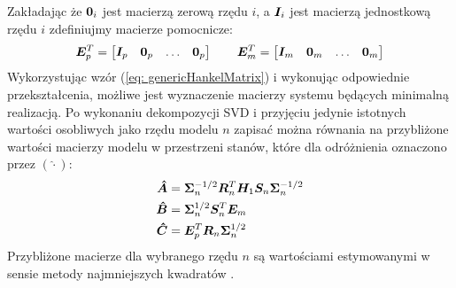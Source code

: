 Zakładając że $\bm{0}_i$ jest macierzą zerową rzędu $i$, a $\bm{I}_i$ jest macierzą jednostkową rzędu $i$ zdefiniujmy macierze pomocnicze:
\begin{equation} 
	\bm{E}^T_p =\begin{bmatrix}
		\bm{I}_p & \bm{0}_p & \dots & \bm{0}_p	
	\end{bmatrix} \qquad
	\bm{E}^T_m = \begin{bmatrix}
		\bm{I}_m & \bm{0}_m & \dots & \bm{0}_m	
	\end{bmatrix} 
\end{equation}
Wykorzystując wzór (\ref{eq: genericHankelMatrix}) i wykonując odpowiednie przekształcenia, możliwe jest wyznaczenie macierzy systemu będących minimalną realizacją. Po wykonaniu dekompozycji SVD i przyjęciu jedynie istotnych wartości osobliwych jako rzędu modelu $n$ zapisać można równania na przybliżone wartości macierzy modelu w przestrzeni stanów, które dla odróżnienia oznaczono przez $(\hat{\cdot})$:
\begin{equation}
	\begin{split}
		\bm{\hat{A}} &= \bm{\Sigma}_n^{-1/2}\bm{R}_n^T\bm{H}_1\bm{S}_n\bm{\Sigma}_n^{-1/2} \\
		\bm{\hat{B}} &= \bm{\Sigma}_n^{1/2}\bm{S}_n^T\bm{E}_m \\
		\bm{\hat{C}} &= \bm{E}_p^T\bm{R}_n\bm{\Sigma}_n^{1/2}
	\end{split}
\end{equation}
Przybliżone macierze dla wybranego rzędu $n$ są wartościami estymowanymi w sensie metody najmniejszych kwadratów \parencite{Juang1994, Rainieri2014}.


